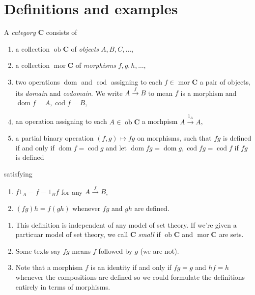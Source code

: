 \documentclass[a4paper]{article}
\renewcommand{\c}[1]{\mathbf{#1}}
\DeclareMathOperator{\ob}{ob}
\DeclareMathOperator{\mor}{mor}
\DeclareMathOperator{\dom}{dom}
\DeclareMathOperator{\cod}{cod}
\begin{document}


\tableofcontents

\section{Definitions and examples}

\begin{definition}[category]
  A \emph{category} \(\c C\) consists of
  \begin{enumerate}
  \item a collection \(\ob \c C\) of \emph{objects} \(A, B, C, \dots\),
  \item a collection \(\mor \c C\) of \emph{morphisms} \(f, g, h, \dots\),
  \item two operations \(\dom\) and \(\cod\) assigning to each \(f \in \mor \c C\) a pair of objects, its \emph{domain} and \emph{codomain}. We write \(A \xrightarrow{f} B\) to mean \(f\) is a morphism and \(\dom f = A, \cod f = B\),
  \item an operation assigning to each \(A \in \ob \c C\) a morhpism \(A \xrightarrow{1_A} A\),
  \item a partial binary operation \((f, g) \mapsto fg\) on morphisms, such that \(fg\) is defined if and only if \(\dom f = \cod g\) and let \(\dom fg = \dom g, \cod fg = \cod f\) if \(fg\) is defined
  \end{enumerate}
  satisfying
  \begin{enumerate}
  \item \(f 1_A = f = 1_B f\) for any \(A \xrightarrow{f} B\),
  \item \((fg) h = f(gh)\) whenever \(fg\) and \(gh\) are defined.
  \end{enumerate}
\end{definition}

\begin{remark}\leavevmode
  \begin{enumerate}
  \item This definition is independent of any model of set theory. If we're given a particuar model of set theory, we call \(\c C\) \emph{small} if \(\ob \c C\) and \(\mor \c C\) are sets.
  \item Some texts say \(fg\) means \(f\) followed by \(g\) (we are not).
  \item Note that a morphism \(f\) is an identity if and only if \(fg = g\) and \(hf = h\) whenever the compositions are defined so we could formulate the definitions entirely in terms of morphisms.
  \end{enumerate}
\end{remark}
\end{document}
